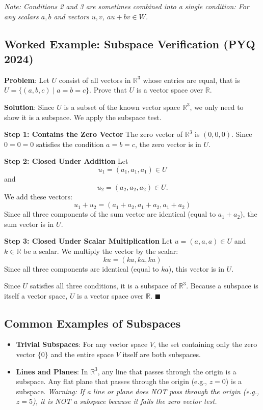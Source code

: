 \documentclass[
]{article}
\providecommand{\tightlist}{%
  \setlength{\itemsep}{0pt}\setlength{\parskip}{0pt}}
\begin{document}
\emph{Note: Conditions 2 and 3 are sometimes combined into a single
condition: For any scalars \(a,b\) and vectors \(u,v\),
\(au + bv \in W\).}

\subsection{Worked Example: Subspace Verification (PYQ
2024)}\label{worked-example-subspace-verification-pyq-2024}

\textbf{Problem}: Let \(U\) consist of all vectors in \(\mathbb{R}^3\)
whose entries are equal, that is
\(U = \lbrace(a, b, c) \mid a = b = c\rbrace\). Prove that \(U\) is a
vector space over \(\mathbb{R}\).

\textbf{Solution}: Since \(U\) is a subset of the known vector space
\(\mathbb{R}^3\), we only need to show it is a subspace. We apply the
subspace test.

\textbf{Step 1: Contains the Zero Vector} The zero vector of
\(\mathbb{R}^3\) is \((0, 0, 0)\). Since \(0 = 0 = 0\) satisfies the
condition \(a=b=c\), the zero vector is in \(U\).

\textbf{Step 2: Closed Under Addition} Let
\[
u_1 = (a_1, a_1, a_1) \in U
\]
and
\[
u_2 = (a_2, a_2, a_2) \in U.
\]
We add these vectors:
\[
u_1 + u_2 = (a_1 + a_2, a_1 + a_2, a_1 + a_2)
\]
Since all three components of the sum vector are identical (equal to
\(a_1 + a_2\)), the sum vector is in \(U\).

\textbf{Step 3: Closed Under Scalar Multiplication} Let
\(u = (a, a, a) \in U\) and \(k \in \mathbb{R}\) be a scalar. We
multiply the vector by the scalar:
\[
k u = (ka, ka, ka)
\]
Since all three components are identical (equal to \(ka\)), this vector
is in \(U\).

Since \(U\) satisfies all three conditions, it is a subspace of
\(\mathbb{R}^3\). Because a subspace is itself a vector space, \(U\) is
a vector space over \(\mathbb{R}\). \(\blacksquare\)

\subsection{Common Examples of
Subspaces}\label{common-examples-of-subspaces}

\begin{itemize}
\tightlist
\item
  \textbf{Trivial Subspaces}: For any vector space \(V\), the set
  containing only the zero vector \(\lbrace 0\rbrace\) and the entire
  space \(V\) itself are both subspaces.
\item
  \textbf{Lines and Planes}: In \(\mathbb{R}^3\), any line that passes
  through the origin is a subspace. Any flat plane that passes through
  the origin (e.g., \(z=0\)) is a subspace. \emph{Warning: If a line or
  plane does NOT pass through the origin (e.g., \(z=5\)), it is NOT a
  subspace because it fails the zero vector test.}
\end{itemize}
\end{document}
